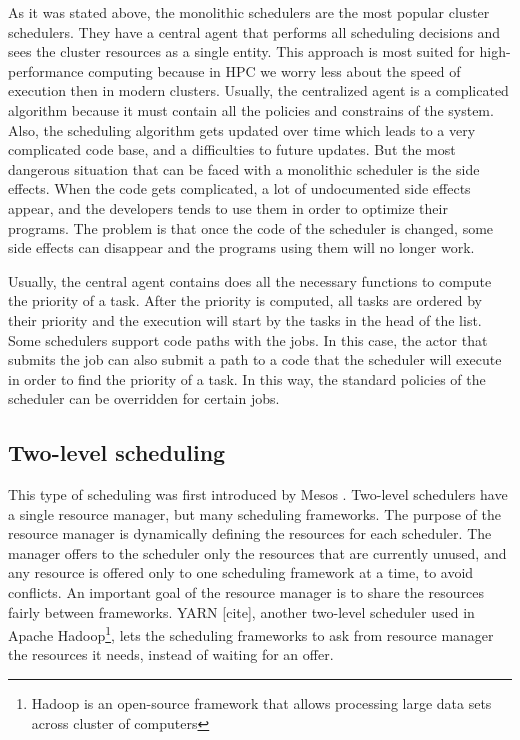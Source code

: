 \documentclass[11pt]{article}
\begin{document}
    	As it was stated above, the monolithic schedulers are the most popular cluster schedulers. They have a central agent that performs all scheduling decisions and sees the cluster resources as a single entity. This approach is most suited for high-performance computing because in HPC we worry less about the speed of execution then in modern clusters. Usually, the centralized agent is a complicated algorithm because it must contain all the policies and constrains of the system. Also, the scheduling algorithm gets updated over time which leads to a very complicated code base, and a difficulties to future updates. But the most dangerous situation that can be faced with a monolithic scheduler is the side effects. When the code gets complicated, a lot of undocumented side effects appear, and the developers tends to use them in order to optimize their programs. The problem is that once the code of the scheduler is changed, some side effects can disappear and the programs using them will no longer work.
        
        Usually, the central agent contains does all the necessary functions to compute the priority of a task. After the priority is computed, all tasks are ordered by their priority and the execution will start by the tasks in the head of the list. Some schedulers support code paths with the jobs. In this case, the actor that submits the job can also submit a path to a code that the scheduler will execute in order to find the priority of a task. In this way, the standard policies of the scheduler can be overridden for certain jobs.
        
       
	\subsection{Two-level scheduling}
    
    	This type of scheduling was first introduced by Mesos \cite{mesos}. Two-level schedulers have a single resource manager, but many scheduling frameworks. The purpose of the resource manager is dynamically defining the resources for each scheduler. The manager offers to the scheduler only the resources that are currently unused, and any resource is offered only to one scheduling framework at a time, to avoid conflicts. An important goal of the resource manager is to share the resources fairly between frameworks. YARN [cite], another two-level scheduler used in Apache Hadoop\footnote{Hadoop is an open-source framework that allows processing large data sets across cluster of computers}, lets the scheduling frameworks to ask from resource manager the resources it needs, instead of waiting for an offer.
        
\end{document}

